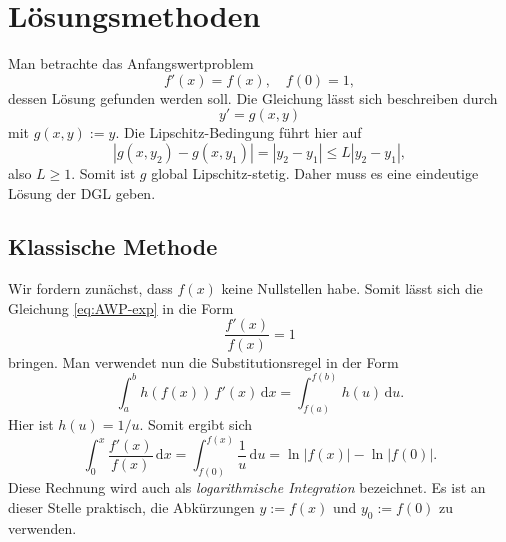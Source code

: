 \documentclass[a4paper,10pt,fleqn,twocolumn,twoside,openany]{article}
\numberwithin{equation}{section}
\theoremstyle{definition}
\begin{document}
\section{Lösungsmethoden}
Man betrachte das Anfangswertproblem
\begin{equation}\label{eq:AWP-exp}
f'(x) = f(x), \quad f(0)=1,
\end{equation}
dessen Lösung gefunden werden soll. Die Gleichung lässt sich
beschreiben durch
\begin{equation}
y' = g(x,y)
\end{equation}
mit $g(x,y):=y$. Die Lipschitz-Bedingung führt hier auf%
\begin{equation}
|g(x,y_2)-g(x,y_1)| = |y_2-y_1|\le L|y_2-y_1|,
\end{equation}
also $L\ge 1$. Somit ist $g$ global Lipschitz-stetig. Daher muss
es eine eindeutige Lösung der DGL geben.

\subsection{Klassische Methode}
Wir fordern zunächst, dass $f(x)$ keine Nullstellen habe. Somit
lässt sich die Gleichung \eqref{eq:AWP-exp} in die Form
\begin{equation}\label{eq:AWP-exp-Umformung}
\frac{f'(x)}{f(x)}=1
\end{equation}
bringen. Man verwendet nun die Substitutionsregel in der Form
\begin{equation}
\int_a^b h(f(x))\,f'(x)\,\mathrm dx
= \int_{f(a)}^{f(b)} h(u)\,\mathrm du.
\end{equation}
Hier ist $h(u)=1/u$. Somit ergibt sich
\begin{equation}
\int_0^x \frac{f'(x)}{f(x)}\,\mathrm dx
= \int_{f(0)}^{f(x)} \frac{1}{u}\,\mathrm du
= \ln|f(x)|-\ln|f(0)|.
\end{equation}
Diese Rechnung wird auch als \emph{logarithmische Integration}
bezeichnet. Es ist an dieser Stelle praktisch, die Abkürzungen
$y:=f(x)$ und $y_0:=f(0)$ zu verwenden.
\end{document}
